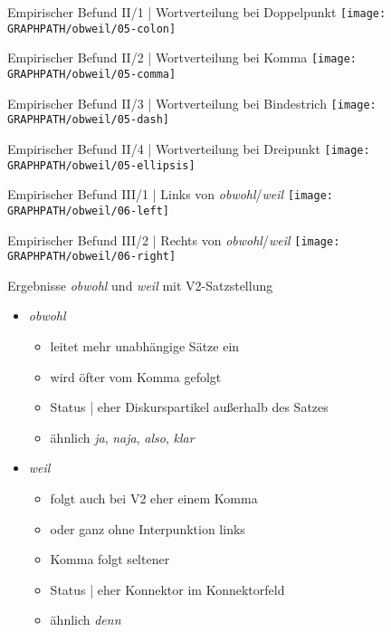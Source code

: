 \begin{frame}
  {Empirischer Befund II/1 | Wortverteilung bei Doppelpunkt}
  \centering 
  \texttt{[image: \\GRAPHPATH/obweil/05-colon]}
\end{frame}

\begin{frame}
  {Empirischer Befund II/2 | Wortverteilung bei Komma}
  \centering 
  \texttt{[image: \\GRAPHPATH/obweil/05-comma]}
\end{frame}

\begin{frame}
  {Empirischer Befund II/3 | Wortverteilung bei Bindestrich}
  \centering 
  \texttt{[image: \\GRAPHPATH/obweil/05-dash]}
\end{frame}

\begin{frame}
  {Empirischer Befund II/4 | Wortverteilung bei Dreipunkt}
  \centering 
  \texttt{[image: \\GRAPHPATH/obweil/05-ellipsis]}
\end{frame}

\begin{frame}
  {Empirischer Befund III/1 | Links von \textit{obwohl}\slash \textit{weil}}
  \centering 
  \texttt{[image: \\GRAPHPATH/obweil/06-left]}
\end{frame}

\begin{frame}
  {Empirischer Befund III/2 | Rechts von \textit{obwohl}\slash \textit{weil}}
  \centering 
  \texttt{[image: \\GRAPHPATH/obweil/06-right]}
\end{frame}

\begin{frame}
  {Ergebnisse}
  \textit{obwohl} und \textit{weil} mit V2-Satzstellung\\
  \Zeile
  \begin{itemize}[<+->]
    \item \textit{obwohl}
      \begin{itemize}[<+->]
        \item leitet mehr unabhängige Sätze ein
        \item wird öfter vom Komma gefolgt
        \item Status | \alert{eher Diskurspartikel außerhalb des Satzes}
        \item ähnlich \textit{ja}, \textit{naja}, \textit{also}, \textit{klar}
      \end{itemize}
      \Zeile
    \item \textit{weil}
      \begin{itemize}[<+->]
        \item folgt auch bei V2 eher einem Komma
        \item oder ganz ohne Interpunktion links
        \item Komma folgt seltener
        \item Status | \alert{eher Konnektor im Konnektorfeld}
        \item ähnlich \textit{denn}
      \end{itemize}
  \end{itemize}
\end{frame}
